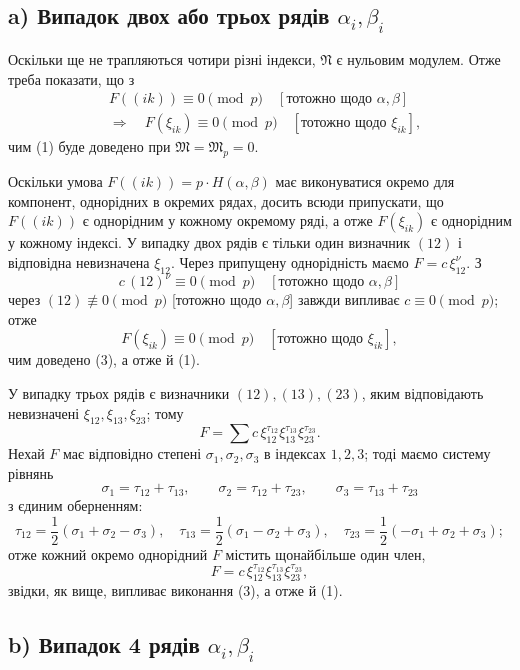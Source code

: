 \documentclass[11pt]{article}
\providecommand{\frM}{\mathfrak M}
\providecommand{\frN}{\mathfrak N}
\begin{document}
\subsection*{a) Випадок двох або трьох рядів \(\alpha_i,\beta_i\)}

Оскільки ще не трапляються чотири різні індекси, \(\frN\) є нульовим модулем. Отже треба показати, що з
\begin{equation}
\begin{aligned}
        &F((ik))\equiv0\pmod p\quad [\text{тотожно щодо \(\alpha,\beta\)}]\\
        &\Longrightarrow\quad
        F(\xi_{ik})\equiv0\pmod p\quad [\text{тотожно щодо \(\xi_{ik}\)}],
\end{aligned}
\end{equation}
чим (1) буде доведено при \(\frM=\frM_p=0\).

Оскільки умова \(F((ik))=p\cdot H(\alpha,\beta)\) має виконуватися окремо для компонент, однорідних в окремих рядах, досить всюди припускати, що \(F((ik))\) є однорідним у кожному окремому ряді, а отже \(F(\xi_{ik})\) є однорідним у кожному індексі. У випадку двох рядів є тільки один визначник \((12)\) і відповідна невизначена \(\xi_{12}\). Через припущену однорідність маємо \(F=c\,\xi_{12}^\nu\). З
\[
        c\,(12)^\nu\equiv0\pmod p\quad[\text{тотожно щодо \(\alpha,\beta\)}]
\]
через \((12)\not\equiv0\pmod p\) [тотожно щодо \(\alpha,\beta\)] завжди випливає \(c\equiv0\pmod p\); отже
\[
        F(\xi_{ik})\equiv0\pmod p\quad [\text{тотожно щодо \(\xi_{ik}\)}],
\]
чим доведено (3), а отже й (1).

У випадку трьох рядів є визначники \((12),(13),(23)\), яким відповідають невизначені \(\xi_{12},\xi_{13},\xi_{23}\); тому
\[
        F=\sum c\,\xi_{12}^{\tau_{12}}\xi_{13}^{\tau_{13}}\xi_{23}^{\tau_{23}}.
\]
Нехай \(F\) має відповідно степені \(\sigma_1,\sigma_2,\sigma_3\) в індексах \(1,2,3\); тоді маємо систему рівнянь
\[
        \sigma_1=\tau_{12}+\tau_{13},\qquad
        \sigma_2=\tau_{12}+\tau_{23},\qquad
        \sigma_3=\tau_{13}+\tau_{23}
\]
з єдиним оберненням:
\[
        \tau_{12}=\frac12(\sigma_1+\sigma_2-\sigma_3),\quad
        \tau_{13}=\frac12(\sigma_1-\sigma_2+\sigma_3),\quad
        \tau_{23}=\frac12(-\sigma_1+\sigma_2+\sigma_3);
\]
отже кожний окремо однорідний \(F\) містить щонайбільше один член,
\[
        F=c\,\xi_{12}^{\tau_{12}}\xi_{13}^{\tau_{13}}\xi_{23}^{\tau_{23}},
\]
звідки, як вище, випливає виконання (3), а отже й (1).

\subsection*{b) Випадок 4 рядів \(\alpha_i,\beta_i\)}
\end{document}
